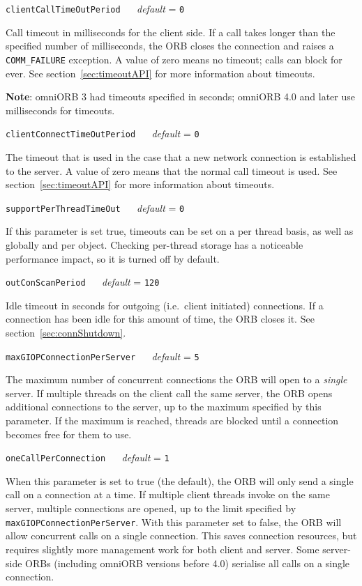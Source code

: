 \documentclass[11pt,twoside,a4paper]{book}
\makeatletter
\newcommand{\code}[1]{\texttt{#1}}
\newcommand{\confopt}[2]
  {\vspace{\baselineskip}\par\noindent\code{#1} ~~ \textit{default} =
   \code{#2}}
\renewcommand{\confopt}[2]
  {\vspace{\baselineskip}\par\noindent\code{#1} ~~ \textit{default} =
   \code{#2}\\[-1ex]\@afterheading}
\newcommand{\dsc}{\discretionary{}{}{}}
\makeatother
\begin{document}
\confopt{clientCallTimeOutPeriod}{0}

Call timeout in milliseconds for the client side. If a call takes
longer than the specified number of milliseconds, the ORB closes the
connection and raises a \code{COMM\_\dsc{}FAILURE} exception. A value
of zero means no timeout; calls can block for ever. See
section~\ref{sec:timeoutAPI} for more information about timeouts.

\vspace{.5\baselineskip}

\noindent\textbf{Note}: omniORB 3 had timeouts specified in seconds;
omniORB 4.0 and later use milliseconds for timeouts.


\confopt{clientConnectTimeOutPeriod}{0}

The timeout that is used in the case that a new network connection is
established to the server. A value of zero means that the normal call
timeout is used. See section~\ref{sec:timeoutAPI} for more information
about timeouts.


\confopt{supportPerThreadTimeOut}{0}

If this parameter is set true, timeouts can be set on a per thread
basis, as well as globally and per object. Checking per-thread storage
has a noticeable performance impact, so it is turned off by default.


\confopt{outConScanPeriod}{120}

Idle timeout in seconds for outgoing (i.e.\ client initiated)
connections. If a connection has been idle for this amount of time,
the ORB closes it. See section~\ref{sec:connShutdown}.


\confopt{maxGIOPConnectionPerServer}{5}

The maximum number of concurrent connections the ORB will open to a
\emph{single} server. If multiple threads on the client call the same
server, the ORB opens additional connections to the server, up to the
maximum specified by this parameter. If the maximum is reached,
threads are blocked until a connection becomes free for them to use.


\confopt{oneCallPerConnection}{1}

When this parameter is set to true (the default), the ORB will only
send a single call on a connection at a time. If multiple client
threads invoke on the same server, multiple connections are opened, up
to the limit specified by
\code{maxGIOPConnection\dsc{}PerServer}. With this parameter set to
false, the ORB will allow concurrent calls on a single
connection. This saves connection resources, but requires slightly
more management work for both client and server. Some server-side ORBs
(including omniORB versions before 4.0) serialise all calls on a
single connection.
\end{document}

